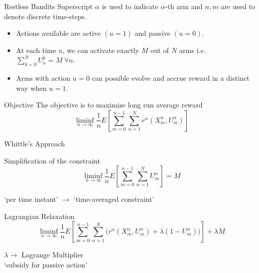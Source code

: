 \documentclass{beamer}
\begin{document}
\begin{frame}{Restless Bandits}
    Superscript $\alpha$ is used to indicate $\alpha$-th arm and $n, m$ are used to denote discrete time-steps.
\begin{itemize}
    \item Actions available are active $(u = 1)$ and passive $(u = 0)$.
    \item At each time $n$, we can activate exactly $M$ out of $N$ arms i.e. $\sum_{k=0}^N U_n^k = M \ \forall n$.
    \item Arms with action $u=0$ can possible evolve and accrue reward in a distinct way when $u=1$. 
\end{itemize}
\begin{block}{Objective}
The objective is to maximize long run average reward 
\begin{equation}
\label{eqn:wobj}
\liminf_{n\rightarrow\infty}\frac{1}{n}E\left[\sum_{m=0}^{n-1}\sum_{\alpha=1}^Nr^\alpha(X^\alpha_m, U^\alpha_m)\right]\nonumber
\end{equation}
\end{block}

\end{frame}


\begin{frame}{Whittle's Approach}
    \begin{block}{Simplification of the constraint}
    \begin{equation}
\liminf_{n\rightarrow\infty}\frac{1}{n}E\left[\sum_{m=0}^{n-1}\sum_{\alpha=1}^NU^\alpha_m\right] = M \label{constraint2}\nonumber
\end{equation}
\begin{center}
    `per time instant' $\rightarrow$ `time-averaged constraint'
\end{center}

    \end{block}
\begin{block}{Lagrangian Relaxation}
\begin{equation}
\liminf_{n\rightarrow\infty}\frac{1}{n}E\left[\sum_{m=0}^{n-1}\sum_{\alpha=1}^N\Big(r^\alpha(X^\alpha_m, U^\alpha_m)+\lambda(1-U_m^\alpha)\Big)\right]+\lambda M \label{reward}\nonumber
\end{equation}
\begin{center}
    $\lambda \rightarrow$ Lagrange Multiplier\\
    `subsidy for passive action' 
\end{center}
\end{block}
\end{frame}
\end{document}
